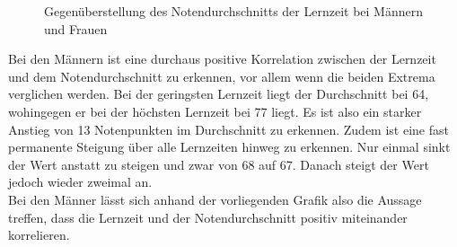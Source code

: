 \documentclass[usegeometry=true]{scrartcl}
\begin{document}
\begin{figure}
\begin{center}
\caption{Gegenüberstellung des Notendurchschnitts der Lernzeit bei Männern und Frauen}
\label{WoMenTree}
\end{center}
\end{figure}

\noindent Bei den Männern ist eine durchaus positive Korrelation zwischen der Lernzeit und dem Notendurchschnitt zu erkennen, vor allem wenn die beiden Extrema verglichen werden. Bei der geringsten Lernzeit liegt der Durchschnitt bei 64, wohingegen er bei der höchsten Lernzeit bei 77 liegt. Es ist also ein starker Anstieg von 13 Notenpunkten im Durchschnitt zu erkennen. Zudem ist eine fast permanente Steigung über alle Lernzeiten hinweg zu erkennen. Nur einmal sinkt der Wert anstatt zu steigen und zwar von 68 auf 67. Danach steigt der Wert jedoch  wieder zweimal an.\\
\noindent Bei den Männer lässt sich anhand der vorliegenden Grafik also die Aussage treffen, dass die Lernzeit und der Notendurchschnitt positiv miteinander korrelieren.\\
\end{document}
